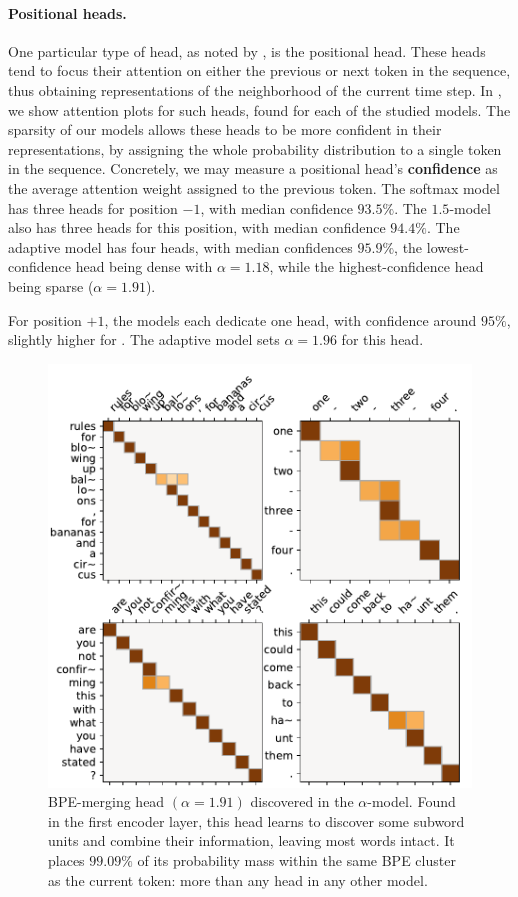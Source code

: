 \paragraph*{Positional heads.}
One particular type of head, as noted by \citet{specialized}, is the
positional head. These heads tend to focus their attention on either
the previous or next token in the sequence, thus obtaining
representations of the neighborhood of the current time step. In
, we show attention plots for such heads, found for
each of the studied models. The sparsity of our models allows these
heads to be more confident in their representations, by assigning the
whole probability distribution to a single token in the sequence.
Concretely, we may measure a positional head's \textbf{confidence} as
the average attention weight assigned to the previous token. The
softmax model has three heads for position $-1$, with median
confidence $93.5\%$. The $1.5$-\entmaxtext model also has three heads
for this position, with median confidence $94.4\%$. The adaptive
model has four heads, with median confidences $95.9\%$, the
lowest-confidence head being dense with $\alpha=1.18$, while the
highest-confidence head being sparse ($\alpha=1.91$).

For position $+1$, the models each dedicate one head, with confidence
around $95\%$, slightly higher for \entmaxtext. The adaptive model
sets $\alpha=1.96$ for this head.

\begin{figure}[t]
    \centering
    \includegraphics[width=0.95\columnwidth]{Figures/head_bpe}
    \caption{%
        BPE-merging head $(\alpha=1.91)$ discovered in the
        $\alpha$-\entmaxtext model. Found in the first encoder layer,
        this head learns to discover some subword units and combine their
        information, leaving most words intact. It places $99.09\%$ of
        its probability mass within the same BPE cluster as the current
        token: more than any head in any other model.}
    \label{fig:head_bpe}
\end{figure}

